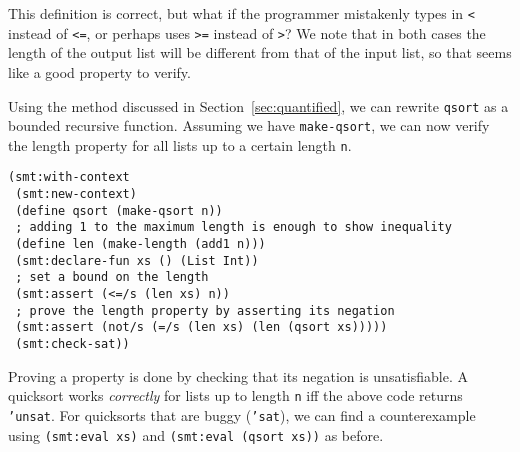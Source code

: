 This definition is correct, but what if the programmer mistakenly types in
\texttt{<} instead of \texttt{<=}, or perhaps uses \texttt{>=} instead of
\texttt{>}? We note that in both cases the length of the output list will be
different from that of the input list, so that seems like a good property to
verify.

Using the method discussed in Section~\ref{sec:quantified}, we can rewrite
\texttt{qsort} as a bounded recursive function. Assuming we have \texttt
{make-qsort}, we can now verify the length property for all lists up to a
certain length \texttt{n}.

\begin{verbatim}
(smt:with-context
 (smt:new-context)
 (define qsort (make-qsort n))
 ; adding 1 to the maximum length is enough to show inequality
 (define len (make-length (add1 n)))
 (smt:declare-fun xs () (List Int))
 ; set a bound on the length
 (smt:assert (<=/s (len xs) n))
 ; prove the length property by asserting its negation
 (smt:assert (not/s (=/s (len xs) (len (qsort xs)))))
 (smt:check-sat))
\end{verbatim}

Proving a property is done by checking that its negation is unsatisfiable. A
quicksort works \textit{correctly} for lists up to length \texttt{n} iff the
above code returns \texttt{'unsat}. For quicksorts that are buggy
(\texttt{'sat}), we can find a counterexample using \texttt{(smt:eval xs)} and
\texttt{(smt:eval (qsort xs))} as before.
